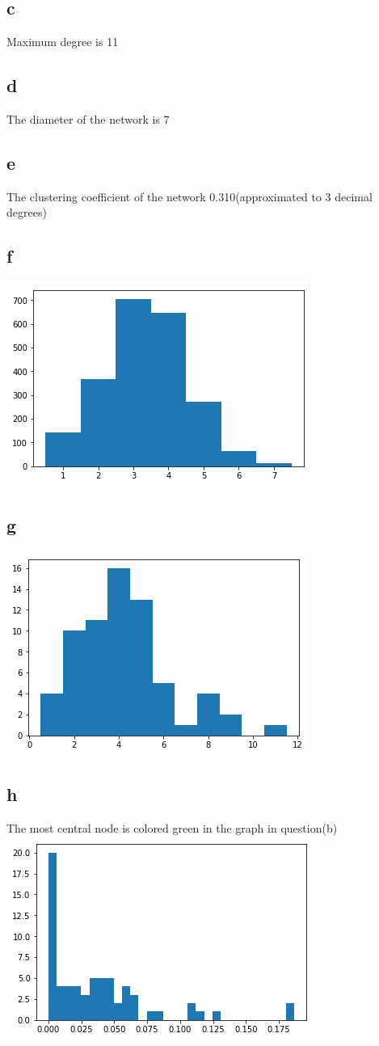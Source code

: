 \documentclass[12pt]{article}
\begin{document}
\subsection*{c} Maximum degree is 11
\subsection*{d} The diameter of the network is 7
\subsection*{e} The clustering coefficient of the network 0.310(approximated to 3 decimal degrees)
\subsection*{f}\includegraphics[scale = 0.7]{22.png}
\subsection*{g}\includegraphics[scale = 0.7]{23.png}
\subsection*{h} The most central node is colored green in the graph in question(b)\\
\includegraphics[scale = 0.7]{24.png}
\end{document}
